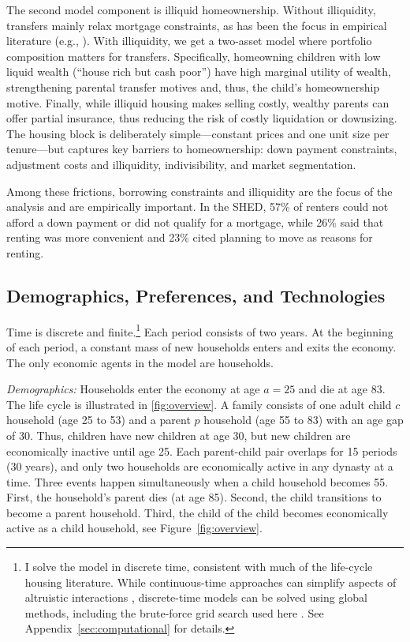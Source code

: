 \documentclass[12pt]{article}
\begin{document}
The second model component is illiquid homeownership. Without illiquidity, transfers mainly relax mortgage constraints, as has been the focus in empirical literature (e.g., \cite{Blickle2019,Engelhardt1998,Guiso2002,Lee2018}). With illiquidity, we get a two-asset model where portfolio composition matters for transfers. Specifically, homeowning children with low liquid wealth (``house rich but cash poor'') have high marginal utility of wealth, strengthening parental transfer motives and, thus, the child's homeownership motive. Finally, while illiquid housing makes selling costly, wealthy parents can offer partial insurance, thus reducing the risk of costly liquidation or downsizing. The housing block is deliberately simple---constant prices and one unit size per tenure---but captures key barriers to homeownership: down payment constraints, adjustment costs and illiquidity, indivisibility, and market segmentation.

Among these frictions, borrowing constraints and illiquidity are the focus of the analysis and are empirically important. In the SHED, 57\% of renters could not afford a down payment or did not qualify for a mortgage, while 26\% said that renting was more convenient and 23\% cited planning to move as reasons for renting. 

\subsection{Demographics, Preferences, and Technologies}\label{sec:dem}
Time is discrete and finite.\footnote{I solve the model in discrete time, consistent with much of the life-cycle housing literature. While continuous-time approaches can simplify aspects of altruistic interactions \citep{Barczyk2014}, discrete-time models can be solved using global methods, including the brute-force grid search used here \citep{Barczyk2020}. See Appendix~\ref{sec:computational} for details.} Each period consists of two years. At the beginning of each period, a constant mass of new households enters and exits the economy. The only economic agents in the model are households.

\textit{Demographics:} Households enter the economy at age $a=25$ and die at age 83. The life cycle is illustrated in \ref{fig:overview}. A family consists of one adult child $c$ household (age 25 to 53) and a parent $p$ household (age 55 to 83) with an age gap of 30. Thus, children have new children at age 30, but new children are economically inactive until age 25. Each parent-child pair overlaps for 15 periods (30 years), and only two households are economically active in any dynasty at a time. Three events happen simultaneously when a child household becomes 55. First, the household's parent dies (at age 85). Second, the child transitions to become a parent household. Third, the child of the child becomes economically active as a child household, see Figure~\ref{fig:overview}.
\end{document}
